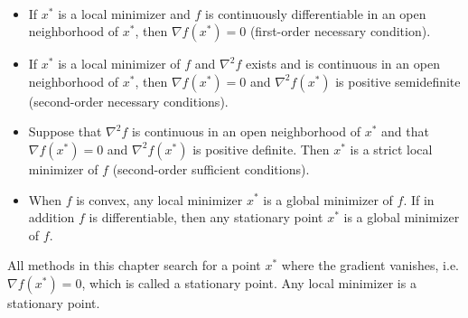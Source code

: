 \begin{theorem} \label{Minimizers} \ \\[-1.5\baselineskip]
    \begin{itemize}
        \item If $x^*$ is a local minimizer and $f$ is continuously differentiable in an open neighborhood of $x^*$, then $\nabla f(x^*) = 0$ (first-order necessary condition).
        \item If $x^*$ is a local minimizer of $f$ and $\nabla^2 f$ exists and is continuous in an open neighborhood of $x^*$, then $\nabla f(x^*) = 0$ and $\nabla^2 f (x^*)$ is positive semidefinite (second-order necessary conditions).
        \item Suppose that $\nabla^2 f$ is continuous in an open neighborhood of $x^*$ and that $\nabla f(x^*) = 0$ and $\nabla^2 f (x^*)$ is positive definite. Then $x^*$ is a strict local minimizer of $f$ (second-order sufficient conditions).
        \item When $f$ is convex, any local minimizer $x^*$ is a global minimizer of $f$. If in addition $f$ is differentiable, then any stationary point $x^*$ is a global minimizer of $f$.
    \end{itemize}
\end{theorem}

All methods in this chapter search for a point $x^*$ where the gradient vanishes, i.e. $\nabla f (x^*) = 0$, which is called a stationary point. Any local minimizer is a stationary point. \\

